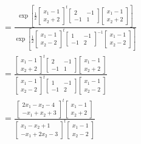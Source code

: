 \documentclass[12pt]{article}
\begin{document}
\begin{enumerate}
\begin{enumerate}
\begin{figure}[H]
\begin{equation}
\begin{split}
      & = \frac{\exp\left[\frac{1}{2}[\begin{array}{l}x_1-1\\x_2+2\end{array}]^t[\begin{array}{cc}2&-1\\-1&1\end{array}][\begin{array}{l}x_1-1\\x_2+2\end{array}]\right]}{\exp\left[\frac{1}{2}[\begin{array}{l}x_1-1\\x_2-2\end{array}]^t[\begin{array}{cc}1&-1\\-1&2\end{array}]^{-1}[\begin{array}{l}x_1-1\\x_2-2\end{array}]\right]} \\
      & = \frac{[\begin{array}{l}x_1-1\\x_2+2\end{array}]^t[\begin{array}{cc}2&-1\\-1&1\end{array}][\begin{array}{l}x_1-1\\x_2+2\end{array}]}{[\begin{array}{l}x_1-1\\x_2-2\end{array}]^t[\begin{array}{cc}1&-1\\-1&2\end{array}][\begin{array}{l}x_1-1\\x_2-2\end{array}]} \\
      & = \frac{[\begin{array}{l}2x_1-x_2-4\\-x_1+x_2+3\end{array}]^t[\begin{array}{l}x_1-1\\x_2+2\end{array}]}{[\begin{array}{l}x_1-x_2+1\\-x_1+2x_2-3\end{array}]^t[\begin{array}{l}x_1-1\\x_2-2\end{array}]} \\

\end{split}
\end{equation}
\end{figure}
\end{enumerate}
\end{enumerate}
\end{document}
